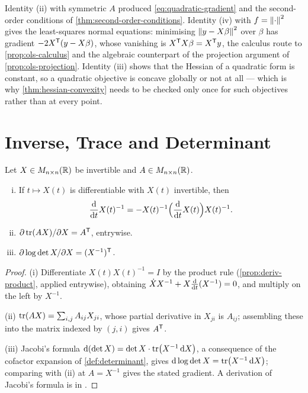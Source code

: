 \begin{eg}\label{eg:matrix-uses}
	Identity (ii) with symmetric $A$ produced \eqref{eq:quadratic-gradient} and the
	second-order conditions of \autoref{thm:second-order-conditions}. Identity (iv)
	with $f=\left\lVert\cdot\right\rVert^{2}$ gives the least-squares normal equations: minimising
	$\left\lVert y-X\beta\right\rVert^{2}$ over $\beta$ has gradient
	$-2X^{\mathsf{T}}(y-X\beta)$, whose vanishing is
	$X^{\mathsf{T}}X\beta=X^{\mathsf{T}}y$, the calculus route to
	\autoref{prop:ols-calculus} and the algebraic counterpart of the projection
	argument of \autoref{prop:ols-projection}. Identity (iii) shows that the Hessian
	of a quadratic form is constant, so a quadratic objective is concave globally or
	not at all --- which is why \autoref{thm:hessian-convexity} needs to be checked
	only once for such objectives rather than at every point.
\end{eg}

\section{Inverse, Trace and Determinant}\label{sec:app-inverse}

\begin{proposition}\label{prop:matrix-derivatives-2}
	Let $X\in M_{n\times n}(\mathbb{R})$ be invertible and $A\in M_{n\times n}(\mathbb{R})$.
	\begin{enumerate}[(i)]
		\item If $t\mapsto X(t)$ is differentiable with $X(t)$ invertible, then
		      \begin{equation}\label{eq:deriv-inverse-matrix}
			      \frac{\mathrm{d} }{\mathrm{d} t}X(t)^{-1}
			      =-X(t)^{-1}\Bigl(\frac{\mathrm{d} }{\mathrm{d} t}X(t)\Bigr)X(t)^{-1}.
		      \end{equation}
		\item $\partial\operatorname{tr}(AX)/\partial X=A^{\mathsf{T}}$, entrywise.
		\item $\partial\log\det X/\partial X=(X^{-1})^{\mathsf{T}}$.
	\end{enumerate}
\end{proposition}

\begin{proof}
	(i) Differentiate $X(t)X(t)^{-1}=I$ by the product rule
	(\autoref{prop:deriv-product}, applied entrywise), obtaining
	$\dot XX^{-1}+X\frac{\mathrm{d} }{\mathrm{d} t}(X^{-1})=0$, and multiply on the left by $X^{-1}$.

	(ii) $\operatorname{tr}(AX)=\sum_{i,j}A_{ij}X_{ji}$, whose partial derivative in $X_{ji}$ is
	$A_{ij}$; assembling these into the matrix indexed by $(j,i)$ gives
	$A^{\mathsf{T}}$.

	(iii) Jacobi's formula $\mathrm{d}(\det X)=\det X\cdot\operatorname{tr}\bigl(X^{-1}\,\mathrm{d} X\bigr)$,
	a consequence of the cofactor expansion of \autoref{def:determinant}, gives
	$\mathrm{d}\log\det X=\operatorname{tr}\bigl(X^{-1}\,\mathrm{d} X\bigr)$; comparing with (ii) at
	$A=X^{-1}$ gives the stated gradient. A derivation of Jacobi's formula is in
	\textcite[Ch.~10]{axler2024linear}.
\end{proof}

